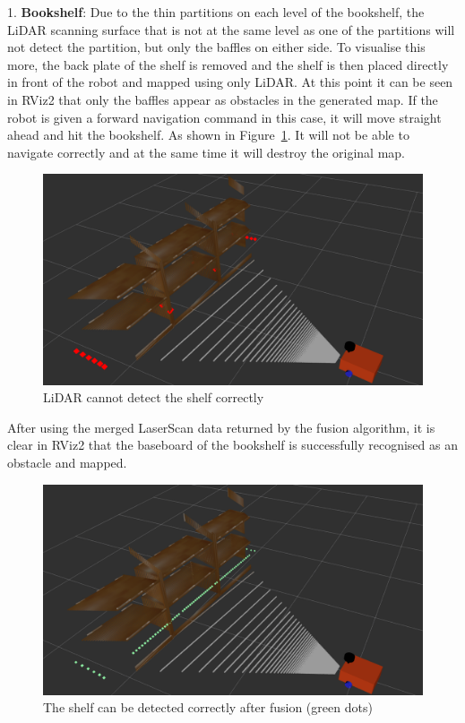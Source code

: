 1. \textbf{Bookshelf}: Due to the thin partitions on each level of the bookshelf, 
the LiDAR scanning surface that is not at the same level as one of the partitions will not detect the partition, 
but only the baffles on either side. To visualise this more, the back plate of the shelf is removed 
and the shelf is then placed directly in front of the robot and mapped using only LiDAR. 
At this point it can be seen in RViz2 that only the baffles appear as obstacles in the generated map. 
If the robot is given a forward navigation command in this case, it will move straight ahead and hit the bookshelf. 
As shown in Figure~\ref{fig:bookshelf}. It will not be able to navigate correctly and at the same time it will destroy the original map.
\begin{figure}[H]
    \centering
    \includegraphics[width=0.8\linewidth]{figs/cannot_shelf.png}
    \caption{LiDAR cannot detect the shelf correctly}
    \label{fig:bookshelf}
\end{figure}
After using the merged LaserScan data returned by the fusion algorithm, 
it is clear in RViz2 that the baseboard of the bookshelf is successfully recognised as an obstacle and mapped.
\begin{figure}[H]
    \centering
    \includegraphics[width=0.8\linewidth]{figs/can_shelf.png}
    \caption{The shelf can be detected correctly after fusion (green dots)}
\end{figure}
